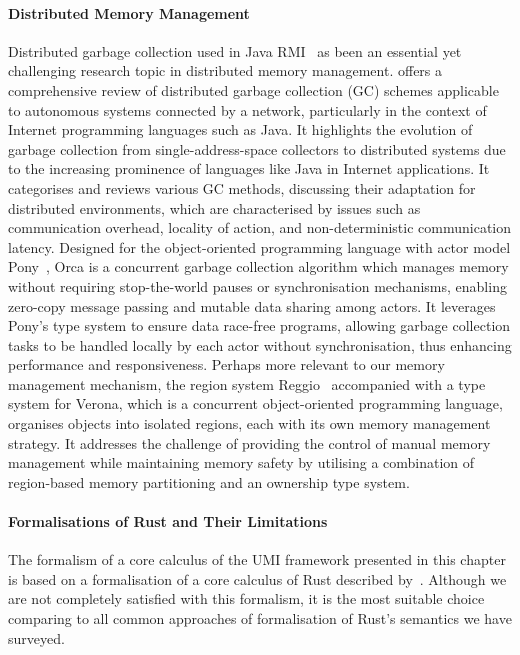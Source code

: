 \paragraph*{Distributed Memory Management}
Distributed garbage collection used in Java RMI~\citep{10.5555/1268049.1268066} as been an essential yet challenging research topic in distributed memory management. \citet{10.1145/292469.292471} offers a comprehensive review of distributed garbage collection (GC) schemes applicable to autonomous systems connected by a network, particularly in the context of Internet programming languages such as Java. It highlights the evolution of garbage collection from single-address-space collectors to distributed systems due to the increasing prominence of languages like Java in Internet applications. It categorises and reviews various GC methods, discussing their adaptation for distributed environments, which are characterised by issues such as communication overhead, locality of action, and non-deterministic communication latency. Designed for the object-oriented programming language with actor model Pony~\citep{10.1145/3133896}, Orca is a concurrent garbage collection algorithm which manages memory without requiring stop-the-world pauses or synchronisation mechanisms, enabling zero-copy message passing and mutable data sharing among actors. It leverages Pony's type system to ensure data race-free programs, allowing garbage collection tasks to be handled locally by each actor without synchronisation, thus enhancing performance and responsiveness.
Perhaps more relevant to our memory management mechanism, the region system Reggio~\citep{10.1145/3622846} accompanied with a type system for Verona, which is a concurrent object-oriented programming language, organises objects into isolated regions, each with its own memory management strategy. It addresses the challenge of providing the control of manual memory management while maintaining memory safety by utilising a combination of region-based memory partitioning and an ownership type system.

\paragraph*{Formalisations of Rust and Their Limitations}
The formalism of a core calculus of the UMI framework presented in this chapter is based on a formalisation of a core calculus of Rust described by~\citet{10.1145/3443420}. Although we are not completely satisfied with this formalism, it is the most suitable choice comparing to all common approaches of formalisation of Rust's semantics we have surveyed.

